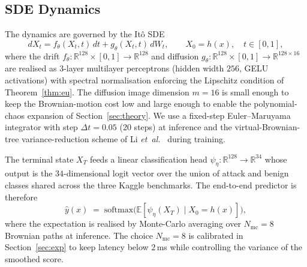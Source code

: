 \documentclass[journal,10pt]{IEEEtran}
\theoremstyle{definition}
\theoremstyle{remark}
\newcommand{\Real}{\mathbb{R}}
\newcommand{\Exp}{\mathbb{E}}
\begin{document}
\subsection{SDE Dynamics}\label{subsec:sde}
The dynamics are governed by the It\^o SDE
\begin{equation}\label{eq:sde-train}
  dX_t = f_\theta(X_t,t)\,dt + g_\theta(X_t,t)\,dW_t,\qquad
  X_0 = h(x),\quad t\in[0,1],
\end{equation}
where the drift $f_\theta:\Real^{128}\!\times\![0,1]\!\to\!\Real^{128}$
and diffusion $g_\theta:\Real^{128}\!\times\![0,1]\!\to\!\Real^{128\times 16}$
are realised as 3-layer multilayer perceptrons (hidden width $256$,
GELU activations) with spectral normalisation enforcing the Lipschitz
condition of Theorem~\ref{thm:eu}. The diffusion image dimension
$m=16$ is small enough to keep the Brownian-motion cost low and
large enough to enable the polynomial-chaos expansion of
Section~\ref{sec:theory}. We use a fixed-step Euler--Maruyama
integrator with step $\Delta t = 0.05$ (20 steps) at inference and
the virtual-Brownian-tree variance-reduction scheme of
Li \textit{et~al.}~\cite{li2020scalable} during training.

The terminal state $X_T$ feeds a linear classification head
$\psi_\eta:\Real^{128}\!\to\!\Real^{34}$ whose output is the
$34$-dimensional logit vector over the union of attack and benign
classes shared across the three Kaggle benchmarks. The end-to-end
predictor is therefore
\begin{equation}\label{eq:predictor}
  \hat y(x) \;=\; \mathrm{softmax}\!\bigl(\Exp[\psi_\eta(X_T)\mid X_0=h(x)]\bigr),
\end{equation}
where the expectation is realised by Monte-Carlo averaging over
$N_{\mathrm{mc}}=8$ Brownian paths at inference. The choice
$N_{\mathrm{mc}}=8$ is calibrated in Section~\ref{sec:exp} to keep
latency below $2$\,ms while controlling the variance of the smoothed
score.
\end{document}
